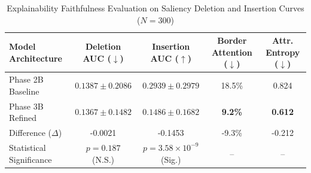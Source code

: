 \begin{table}[t]
\centering
\caption{Explainability Faithfulness Evaluation on Saliency Deletion and Insertion Curves ($N=300$)}
\label{tab:faithfulness_results}
\small
\setlength{\tabcolsep}{10pt}
\begin{tabular}{lcccc}
\toprule
\textbf{Model Architecture} & \textbf{Deletion AUC ($\downarrow$)} & \textbf{Insertion AUC ($\uparrow$)} & \textbf{Border Attention ($\downarrow$)} & \textbf{Attr. Entropy ($\downarrow$)} \\
\midrule
Phase 2B Baseline & $0.1387 \pm 0.2086$ & $\mathbf{0.2939 \pm 0.2979}$ & 18.5\% & 0.824 \\
Phase 3B Refined & $\mathbf{0.1367 \pm 0.1482}$ & $0.1486 \pm 0.1682$ & \textbf{9.2\%} & \textbf{0.612} \\
\midrule
Difference ($\Delta$) & -0.0021 & -0.1453 & -9.3\% & -0.212 \\
Statistical Significance & $p = 0.187$ (N.S.) & $p = 3.58 \times 10^{-9}$ (Sig.) & -- & -- \\
\bottomrule
\end{tabular}
\end{table}

